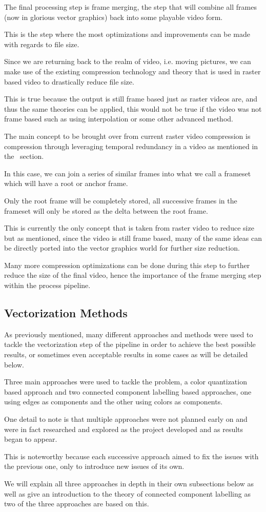 \documentclass[12pt]{article}
\newcommand{\sentence}{} %
\begin{document}
    \tab
    The final processing step is frame merging, the step that will combine all frames (now in glorious vector
    graphics) back into some playable video form.
    \sentence
    This is the step where the most optimizations and improvements can be made with regards to file size.
    \sentence
    Since we are returning back to the realm of video, i.e. moving pictures, we can make use of the existing
    compression technology and theory that is used in raster based video to drastically reduce file size.
    \sentence
    This is true because the output is still frame based just as raster videos are, and thus the same theories can be
    applied, this would not be true if the video was not frame based such as using interpolation or some other
    advanced method.
    \sentence
    The main concept to be brought over from current raster video compression is compression through leveraging
    temporal redundancy in a video as mentioned in the~ section.
    \sentence
    In this case, we can join a series of similar frames into what we call a frameset which will have a root
    or anchor frame.
    \sentence
    Only the root frame will be completely stored, all successive frames in the frameset will only be stored as the
    delta between the root frame.
    \sentence
    This is currently the only concept that is taken from raster video to reduce size but as mentioned, since the
    video is still frame based, many of the same ideas can be directly ported into the vector graphics world for
    further size reduction.
    \sentence
    Many more compression optimizations can be done during this step to further reduce the size of the final
    video, hence the importance of the frame merging step within the process pipeline.


    \subsection{Vectorization Methods}\label{subsec:vectorization-methods}

    \tab
    As previously mentioned, many different approaches and methods were used to tackle the vectorization step of the
    pipeline in order to achieve the best possible results, or sometimes even acceptable results in some cases as
    will be detailed below.
    \sentence
    Three main approaches were used to tackle the problem, a color quantization based approach and two connected
    component labelling based approaches, one using edges as components and the other using colors as components.
    \sentence
    One detail to note is that multiple approaches were not planned early on and were in fact researched and explored
    as the project developed and as results began to appear.
    \sentence
    This is noteworthy because each successive approach aimed to fix the issues with the previous one, only to
    introduce new issues of its own.
    \sentence
    We will explain all three approaches in depth in their own subsections below as well as give an introduction to
    the theory of connected component labelling as two of the three approaches are based on this.
\end{document}
